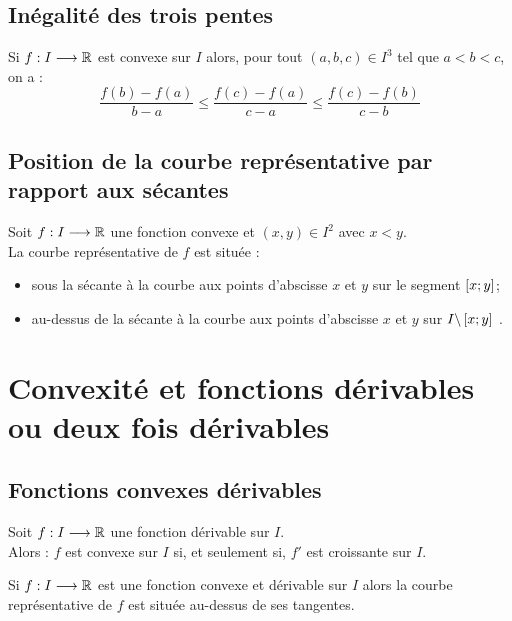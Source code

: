 \subsection{Inégalité des trois pentes}
\begin{defprop}
    Si \(f : I \longrightarrow \mathbb{R}\) est convexe sur \(I\) alors, pour tout \((a, b, c) \in I^3\) tel que \(a < b < c\), on a :
    \[\frac{f (b) - f (a)}{b - a }\leq \frac{ f (c) - f (a) }{c - a } \leq \frac{f (c) - f (b) }{c - b}\] 
\end{defprop}

\subsection{Position de la courbe représentative par rapport aux sécantes}
\begin{defprop}
    Soit \(f : I \longrightarrow \mathbb{R}\) une fonction convexe et \((x, y) \in I^2\) avec \(x < y\).\\
    La courbe représentative de \(f\) est située :
    \begin{itemize}
        \item sous la sécante à la courbe aux points d’abscisse \(x\) et \(y\) sur le segment \(\left[x;y\right] \);
        \item au-dessus de la sécante à la courbe aux points d’abscisse \(x\) et \(y\) sur \(I \backslash \left[x;y\right]\) .
    \end{itemize}
\end{defprop}

\section{Convexité et fonctions dérivables ou deux fois dérivables}
\subsection{Fonctions convexes dérivables}
\begin{defprop}
    Soit \(f : I \longrightarrow \mathbb{R}\) une fonction dérivable sur \(I\).\\
    Alors : \(f\) est convexe sur \(I\) si, et seulement si, \(f '\) est croissante sur \(I\).
\end{defprop}
\begin{defprop}
    Si \(f : I \longrightarrow \mathbb{R}\) est une fonction convexe et dérivable sur \(I\) alors la courbe représentative de \(f\) est située au-dessus de ses tangentes.
\end{defprop}

